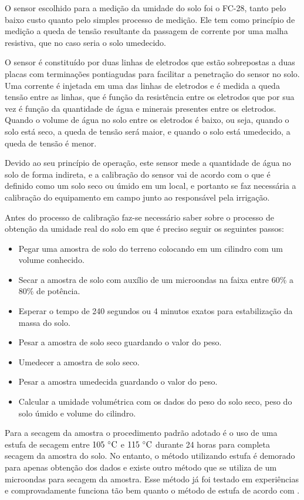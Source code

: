   O sensor escolhido para a medição da umidade do solo foi o FC-28,
  tanto pelo baixo custo quanto pelo simples processo de medição.
  Ele tem como princípio de medição a queda de tensão resultante da
  passagem de corrente por uma malha resistiva, que no caso seria o solo
  umedecido.

  O sensor é constituído por duas linhas de eletrodos que estão
  sobrepostas a duas placas com terminações pontiagudas para facilitar a
  penetração do sensor no solo. Uma corrente é injetada em uma das linhas
  de eletrodos e é medida a queda tensão entre as linhas, que é função da
  resistência entre os eletrodos que por sua vez é função da quantidade de
  água e minerais presentes entre os eletrodos. Quando o volume de água no
   solo entre os eletrodos é baixo, ou seja, quando o solo está seco,
   a queda de tensão será maior, e quando o solo está umedecido,
   a queda de tensão é menor.

  Devido ao seu princípio de operação, este sensor mede a quantidade de
  água no solo de forma indireta, e a calibração do sensor vai de acordo
  com o que é definido como um solo seco ou úmido em um local, e portanto
  se faz necessária a calibração do equipamento em campo junto ao
  responsável pela irrigação.
  
  Antes do processo de calibração faz-se necessário saber sobre o processo de obtenção
  da umidade real do solo em que é preciso seguir os seguintes passos:
  
  \begin{itemize}
  	\item Pegar uma amostra de solo do terreno colocando em um cilindro com um volume conhecido.
  	\item Secar a amostra de solo com auxílio de um microondas na faixa entre 60\% a 80\% de potência.
  	\item Esperar o tempo de 240 segundos ou 4 minutos exatos para estabilização da massa do solo.
  	\item Pesar a amostra de solo seco guardando o valor do peso.
  	\item Umedecer a amostra de solo seco.
  	\item Pesar a amostra umedecida guardando o valor do peso.
  	\item Calcular a umidade volumétrica com os dados do peso do solo seco, peso do solo úmido e volume do cilindro.
  \end{itemize}
  
  Para a secagem da amostra o procedimento padrão adotado é o uso de uma estufa de
  secagem entre $105~\celsius$ e $115~\celsius$ durante 24 horas para completa secagem da
  amostra do solo. No entanto, o método utilizando estufa é demorado para apenas
  obtenção dos dados e existe outro método que se utiliza de um microondas para
  secagem da amostra. Esse método já foi testado em experiências e comprovadamente
  funciona tão bem quanto o método de estufa de acordo com .
  
